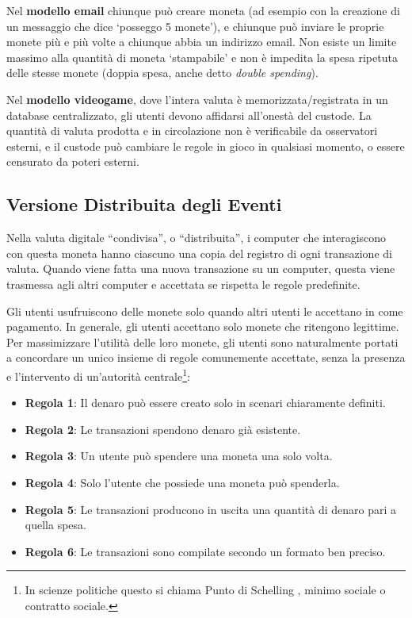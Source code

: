 Nel \textbf{modello email} chiunque può creare moneta (ad esempio con la creazione di un messaggio che dice ‘posseggo 5 monete’), e chiunque può inviare le proprie monete più e più volte a chiunque abbia un indirizzo email. Non esiste un limite massimo alla quantità di moneta ‘stampabile’ e non è impedita la spesa ripetuta delle stesse monete (doppia spesa, anche detto \emph{double spending}).

Nel \textbf{modello videogame}, dove l’intera valuta è memorizzata/registrata in un database centralizzato, gli utenti devono affidarsi all'onestà del custode. La quantità di valuta prodotta e in circolazione non è verificabile da osservatori esterni, e il custode può cambiare le regole in gioco in qualsiasi momento, o essere censurato da poteri esterni.


\subsection{Versione Distribuita degli Eventi}
\label{subsec:shared-version-events}

Nella valuta digitale “condivisa”, o “distribuita”, i computer che interagiscono con questa moneta hanno ciascuno una copia del registro di ogni transazione di valuta. Quando viene fatta una nuova transazione su un computer, questa viene trasmessa agli altri computer e accettata se rispetta le regole predefinite.

Gli utenti usufruiscono delle monete solo quando altri utenti le accettano in come pagamento. In generale, gli utenti accettano solo monete che ritengono legittime. Per massimizzare l’utilità delle loro monete, gli utenti sono naturalmente portati a concordare un unico insieme di regole comunemente accettate, senza la presenza e l'intervento di un’autorità centrale\footnote{In scienze politiche questo si chiama Punto di Schelling \cite{friedman-schelling}, minimo sociale o contratto sociale.}:
\begin{itemize}
    \item[] \textbf{Regola 1}: Il denaro può essere creato solo in scenari chiaramente definiti.
    \item[] \textbf{Regola 2}: Le transazioni spendono denaro già esistente.
    \item[] \textbf{Regola 3}: Un utente può spendere una moneta una solo volta.
    \item[] \textbf{Regola 4}: Solo l'utente che possiede una moneta può spenderla.
    \item[] \textbf{Regola 5}: Le transazioni producono in uscita una quantità di denaro pari a quella spesa.
    \item[] \textbf{Regola 6}: Le transazioni sono compilate secondo un formato ben preciso.
\end{itemize}

